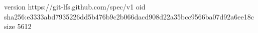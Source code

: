 version https://git-lfs.github.com/spec/v1
oid sha256:e3333abd7935226dd5b476b9c2b066dacd908d22a35bcc9566ba07d92a6ee18c
size 5612

